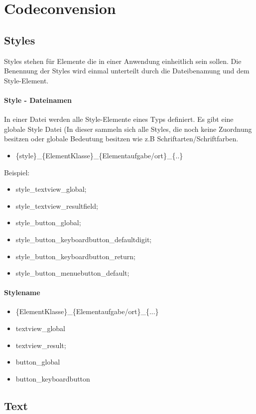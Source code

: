 
\section{Codeconvension}
\subsection{Styles}
Styles stehen für Elemente die in einer Anwendung einheitlich sein sollen. Die Benennung der Styles wird einmal unterteilt durch die Dateibenamung und dem Style-Element.
\paragraph{Style - Dateinamen}
In einer Datei werden alle Style-Elemente eines Typs definiert. Es gibt eine globale Style Datei (In dieser sammeln sich alle Styles, die noch keine Zuordnung besitzen oder globale Bedeutung besitzen wie z.B Schriftarten/Schriftfarben.

\begin{itemize}
\item \{style\}\_\{ElementKlasse\}\_\{Elementaufgabe/ort\}\_\{..\}
\end{itemize}

Beispiel:
\begin{itemize}
\item style\_textview\_global;
\item style\_textview\_resultfield;
\item style\_button\_global;
\item style\_button\_keyboardbutton\_defaultdigit;
\item style\_button\_keyboardbutton\_return;
\item style\_button\_menuebutton\_default;
\end{itemize}


\paragraph{Stylename}
\begin{itemize}
\item \{ElementKlasse\}\_\{Elementaufgabe/ort\}\_\{...\}
\item textview\_global
\item textview\_result;
\item button\_global
\item button\_keyboardbutton
\end{itemize}


\subsection{Text}

